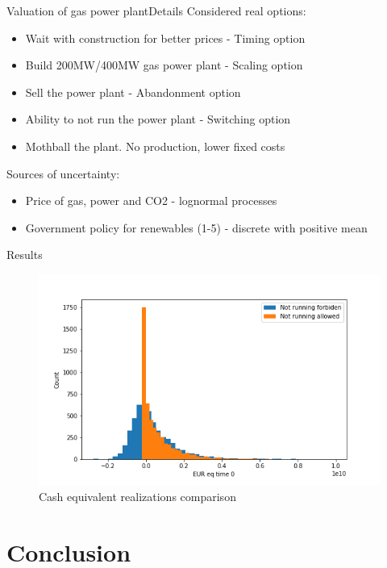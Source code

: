 \documentclass[us]{beamer}
\begin{document}
	\begin{frame}{Valuation of gas power plant}{Details}
	Considered real options:
	\begin{itemize}
		\item {Wait with construction for better prices - Timing option }
		\item {Build 200MW/400MW gas power plant - Scaling option}
		\item {Sell the power plant - Abandonment option}
		\item {Ability to not run the power plant - Switching option}
		\item {Mothball the plant. No production, lower fixed costs} 
	\end{itemize}
	
	Sources of uncertainty: 
	\begin{itemize}
		\item {Price of gas, power and CO2 - lognormal processes}
		\item {Government policy for renewables (1-5) - discrete with positive mean}
	\end{itemize}	
	\end{frame}
	

	\begin{frame}{Results}
	  \begin{figure}
		\includegraphics[scale=0.5]{figures/Runnability.png}
		\caption{Cash equivalent realizations comparison}
	\end{figure}
	\end{frame}


\section{Conclusion}
\end{document}
